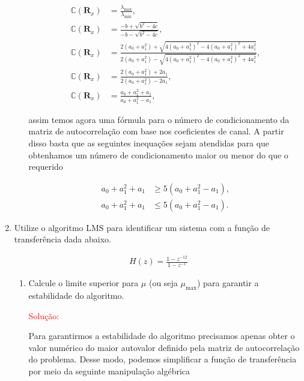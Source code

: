 \documentclass[a4paper,10pt]{article}
\begin{document}
\begin{enumerate}
\begin{enumerate}
						\begin{align}
							\mathbb{C} (\mathbf{R}_{x}) &= \frac{\lambda_{\text{max}}}{\lambda_{\text{min}}}, \\
							\mathbb{C} (\mathbf{R}_{x}) &= \frac{- b + \sqrt{b^{2} - 4c}}{- b - \sqrt{b^{2} - 4c}}, \\
							\mathbb{C} (\mathbf{R}_{x}) &= \frac{2 (a_{0} + a^{2}_{1}) + \sqrt{4 (a_{0} + a^{2}_{1})^{2} - 4 (a_{0} + a^{2}_{1})^{2} + 4 a^{2}_{1}}}{2 (a_{0} + a^{2}_{1}) - \sqrt{4 (a_{0} + a^{2}_{1})^{2} - 4 (a_{0} + a^{2}_{1})^{2} + 4 a^{2}_{1}}}, \\
							\mathbb{C} (\mathbf{R}_{x}) &= \frac{2 (a_{0} + a^{2}_{1}) + 2a_{1}}{2 (a_{0} + a^{2}_{1}) - 2a_{1}}, \\
							\mathbb{C} (\mathbf{R}_{x}) &= \frac{a_{0} + a^{2}_{1} + a_{1}}{a_{0} + a^{2}_{1} - a_{1}},
						\end{align}

						assim temos agora uma fórmula para o número de condicionamento da matriz de autocorrelação com base nos coeﬁcientes de canal. A partir disso basta que as seguintes inequações sejam atendidas para que
						obtenhamos um número de condicionamento maior ou menor do que o requerido

						\begin{align}
							a_{0} + a^{2}_{1} + a_{1} &\geq 5 (a_{0} + a^{2}_{1} - a_{1}), \\
							a_{0} + a^{2}_{1} + a_{1} &\leq 5 (a_{0} + a^{2}_{1} - a_{1}).
						\end{align}

				\end{enumerate}
			
			\item Utilize o algoritmo LMS para identiﬁcar um sistema com a função de transferência dada abaixo.
			
				\begin{align}
					H(z) = \frac{1 - z^{-12}}{1 - z^{-1}}
				\end{align}
			
				\begin{enumerate}
					
					\item Calcule o limite superior para $\mu$ (ou seja $\mu_{\text{max}}$) para garantir a estabilidade do algoritmo.
					
						\textcolor{red}{Solução:}
					
						Para garantirmos a estabilidade do algoritmo precisamos apenas obter o valor numérico do maior autovalor definido pela matriz de autocorrelação do problema.
						Desse modo, podemos simplificar a função de transferência por meio da seguinte manipulação algébrica


\end{enumerate}
\end{enumerate}
\end{document}
